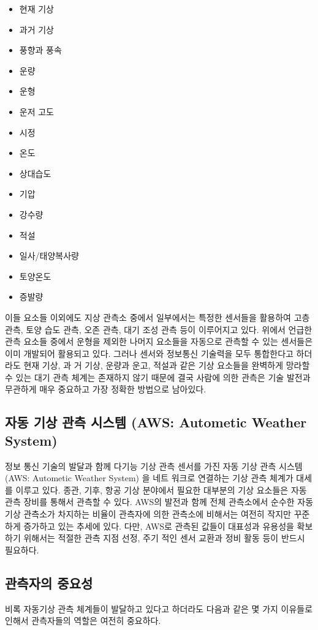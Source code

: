 \begin{itemize}
\begin{itemize}
	\item 현재 기상
	\item 과거 기상
	\item 풍향과 풍속
	\item 운량
	\item 운형
	\item 운저 고도
	\item 시정
	\item 온도
	\item 상대습도
	\item 기압
	\item 강수량
	\item 적설
	\item 일사/태양복사량
	\item 토양온도
	\item 증발량
\end{itemize}

이들 요소들 이외에도 지상 관측소 중에서 일부에서는 특정한 센서들을 활용하여 고층 관측, 토양 습도 관측, 오존 관측, 대기 조성 관측 등이 이루어지고 있다. 위에서 언급한 관측 요소들 중에서 운형을 제외한 나머지 요소들을 자동으로 관측할 수 있는 센서들은 이미 개발되어 활용되고 있다. 그러나 센서와 정보통신 기술력을 모두 통합한다고 하더라도 현재 기상, 과
거 기상, 운량과 운고, 적설과 같은 기상 요소들을 완벽하게 망라할 수 있는 대기 관측 체계는 존재하지 않기 때문에 결국 사람에 의한 관측은 기술 발전과 무관하게 매우 중요하고 가장 정확한 방법으로 남아있다.

\subsection{자동 기상 관측 시스템 (AWS: Autometic Weather System)}

정보 통신 기술의 발달과 함께 다기능 기상 관측 센서를 가진 자동 기상 관측 시스템 (AWS: Autometic Weather System) 을 네트 워크로 연결하는 기상 관측 체계가 대세를 이루고 있다. 종관, 기후, 항공 기상 분야에서 필요한 대부분의 기상 요소들은 자동 관측 장비를 통해서 관측할 수 있다. AWS의 발전과 함께 전체 관측소에서 순수한 자동기상 관측소가 차지하는 비율이 관측자에 의한 관측소에 비해서는 여전히 작지만 꾸준하게 증가하고 있는 추세에 있다. 다만, AWS로 관측된 값들이 대표성과 유용성을 확보하기 위해서는 적절한 관측 지점 선정, 주기 적인 센서 교환과 정비 활동 등이 반드시 필요하다.

\subsection{관측자의 중요성}
비록 자동기상 관측 체계들이 발달하고 있다고 하더라도 다음과 같은 몇 가지 이유들로 인해서 관측자들의 역할은 여전히 중요하다.


\end{itemize}
